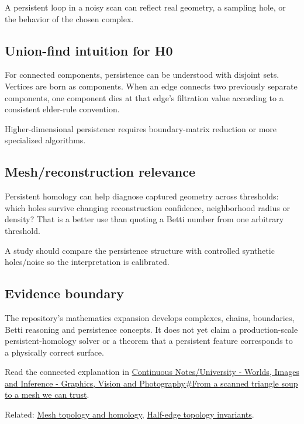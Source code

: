 A persistent loop in a noisy scan can reflect real geometry, a sampling hole, or the behavior of the chosen complex.

\subsection{Union-find intuition for H0}\label{appendix-e4d8ed8d6787-union-find-intuition-for-h0}

For connected components, persistence can be understood with disjoint sets. Vertices are born as components. When an edge connects two previously separate components, one component dies at that edge's filtration value according to a consistent elder-rule convention.

Higher-dimensional persistence requires boundary-matrix reduction or more specialized algorithms.

\subsection{Mesh/reconstruction relevance}\label{appendix-e4d8ed8d6787-meshreconstruction-relevance}

Persistent homology can help diagnose captured geometry across thresholds: which holes survive changing reconstruction confidence, neighborhood radius or density? That is a better use than quoting a Betti number from one arbitrary threshold.

A study should compare the persistence structure with controlled synthetic holes/noise so the interpretation is calibrated.

\subsection{Evidence boundary}\label{appendix-e4d8ed8d6787-evidence-boundary}

The repository's mathematics expansion develops complexes, chains, boundaries, Betti reasoning and persistence concepts. It does not yet claim a production-scale persistent-homology solver or a theorem that a persistent feature corresponds to a physically correct surface.

Read the connected explanation in \hyperref[03-visual-computing-i-ch002-from-a-scanned-triangle-soup-to-a-mesh-we-can-trust]{Continuous Notes/University - Worlds, Images and Inference - Graphics, Vision and Photography\#From a scanned triangle soup to a mesh we can trust}.

Related: \hyperref[appendix-e38976cbbf86]{Mesh topology and homology}, \hyperref[appendix-faac749c9cdd]{Half-edge topology invariants}.
